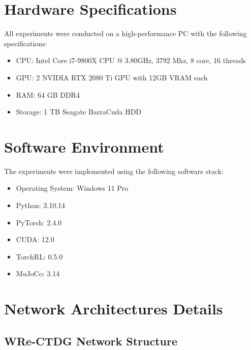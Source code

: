 \section{Hardware Specifications}

All experiments were conducted on a high-performance
PC with the following specifications: 

\begin{itemize}
    \item CPU: Intel Core i7-9800X CPU @ 3.80GHz,
    3792 Mhz, 8 core, 16 threads
    \item GPU: 2 NVIDIA RTX 2080 Ti GPU with 12GB
    VRAM each
    \item RAM: 64 GB DDR4
    \item Storage: 1 TB Seagate BarraCuda HDD
\end{itemize}

\section{Software Environment}

The experiments were implemented using the following software stack:

\begin{itemize}
    \item Operating System: Windows 11 Pro
    \item Python: 3.10.14
    \item PyTorch: 2.4.0
    \item CUDA: 12.0
    \item TorchRL: 0.5.0
    \item MuJoCo: 3.14
\end{itemize}

\section{Network Architectures Details}

\subsection{WRe-CTDG Network Structure}

